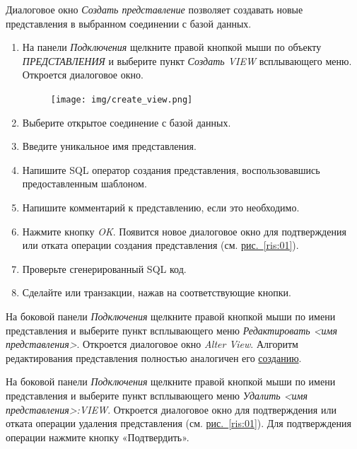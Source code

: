 
\label{sec:crview}

Диалоговое окно \textit{Создать представление} позволяет создавать новые представления в выбранном соединении с базой данных.

\begin{enumerate}[leftmargin=26pt]
	\item  На панели \textit{Подключения} щелкните правой кнопкой мыши по объекту \textit{ПРЕДСТАВЛЕНИЯ} и выберите пункт \textit{Создать VIEW} всплывающего меню. Откроется диалоговое окно.
	\begin{figure}[H]
		\centering
		\texttt{[image: img/create\_view.png]}
	\end{figure}
	\item Выберите открытое соединение с базой данных.
	\item Введите уникальное имя представления.
	\item Напишите SQL оператор создания представления, воспользовавшись предоставленным шаблоном.
	\item Напишите комментарий к представлению, если это необходимо.
	\item Нажмите кнопку \textit{OK}. Появится новое диалоговое окно для подтверждения или отката операции создания представления (см. \hyperref[ris:01]{рис.~\ref{ris:01}}).
	\item Проверьте сгенерированный SQL код.
	\item Сделайте  или  транзакции, нажав на соответствующие кнопки.
\end{enumerate}	

На боковой панели \textit{Подключения} щелкните правой кнопкой мыши по имени представления и выберите пункт всплывающего меню \textit{Редактировать <имя представления>}. Откроется диалоговое окно \textit{Alter View}. Алгоритм редактирования представления полностью аналогичен его \hyperref[sec:crview]{созданию}.

На боковой панели \textit{Подключения} щелкните правой кнопкой мыши по имени представления и выберите пункт всплывающего меню \textit{Удалить <имя представления>:VIEW}. Откроется  диалоговое окно для подтверждения или отката операции удаления представления (см. \hyperref[ris:01]{рис.~\ref{ris:01}}). Для подтверждения операции нажмите кнопку «Подтвердить».


